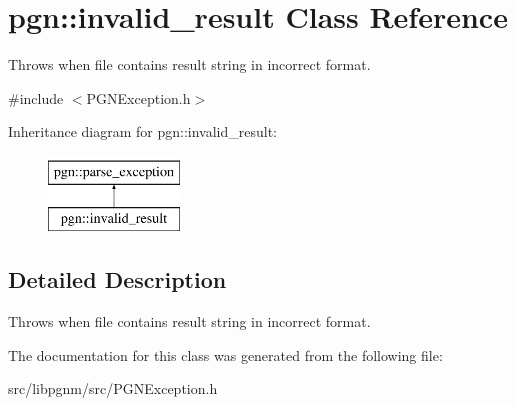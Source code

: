 \hypertarget{classpgn_1_1invalid__result}{
\section{pgn::invalid\_\-result Class Reference}
\label{classpgn_1_1invalid__result}
}


Throws when file contains result string in incorrect format.  




{\ttfamily \#include $<$PGNException.h$>$}

Inheritance diagram for pgn::invalid\_\-result:\begin{figure}[H]
\begin{center}
\leavevmode
\includegraphics[height=2.000000cm]{classpgn_1_1invalid__result}
\end{center}
\end{figure}


\subsection{Detailed Description}
Throws when file contains result string in incorrect format. 

The documentation for this class was generated from the following file:\begin{DoxyCompactItemize}
\item 
src/libpgnm/src/PGNException.h\end{DoxyCompactItemize}
